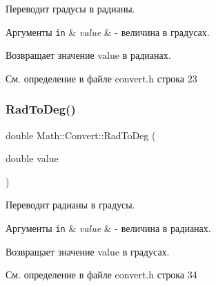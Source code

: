 Переводит градусы в радианы. 


\begin{DoxyParams}[1]{Аргументы}
\mbox{\tt in}  & {\em value} & -\/ величина в градусах. \\
\hline
\end{DoxyParams}
\begin{DoxyReturn}{Возвращает}
значение value в радианах. 
\end{DoxyReturn}


См. определение в файле convert.\+h строка 23

\hypertarget{namespace_math_1_1_convert_a06704cbaaeb06e60eed69d61b3d4d912}{}\label{namespace_math_1_1_convert_a06704cbaaeb06e60eed69d61b3d4d912} 
\subsubsection{\texorpdfstring{Rad\+To\+Deg()}{RadToDeg()}}
{\footnotesize\ttfamily double Math\+::\+Convert\+::\+Rad\+To\+Deg (\begin{DoxyParamCaption}\item[{double}]{value }\end{DoxyParamCaption})\hspace{0.3cm}{\ttfamily [inline]}}



Переводит радианы в градусы. 


\begin{DoxyParams}[1]{Аргументы}
\mbox{\tt in}  & {\em value} & -\/ величина в радианах. \\
\hline
\end{DoxyParams}
\begin{DoxyReturn}{Возвращает}
значение value в градусах. 
\end{DoxyReturn}


См. определение в файле convert.\+h строка 34

